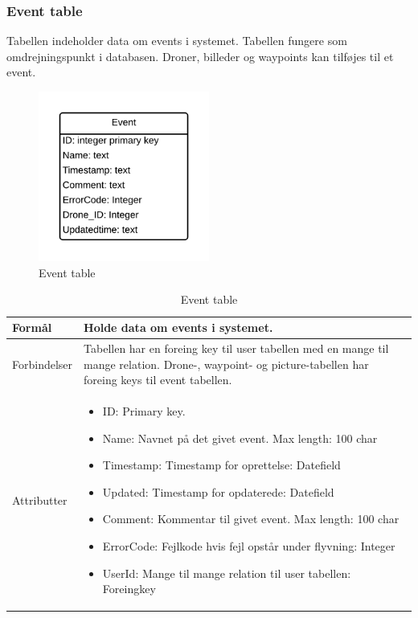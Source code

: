 \subsubsection*{Event table}
Tabellen indeholder data om events i systemet. Tabellen fungere som omdrejningspunkt i databasen. Droner, billeder og waypoints kan tilføjes til et event.
\vspace{-5pt}
\begin{figure}[H]
	\centering
	\includegraphics[width=0.5\textwidth]{Billeder/database/EventTable.png}
	\vspace{-5pt}
	\caption{Event table}
	\label{fig:event_table}
\end{figure}

\begin{table}[H]
\begin{tabular}{| p{3cm}| p{11.5cm}|}
\hline

Formål	 							& Holde data om events i systemet.\\\hline
Forbindelser						& Tabellen har en foreing key til user tabellen med en mange til mange relation. Drone-, waypoint- og picture-tabellen har foreing keys til event tabellen.\\\hline
Attributter						& \begin{itemize}
												\item ID: Primary key.
												\item Name: Navnet på det givet event. Max length: 100 char
												\item Timestamp: Timestamp for oprettelse: Datefield
												\item Updated: Timestamp for opdaterede: Datefield
												\item Comment: Kommentar til givet event. Max length: 100 char
												\item ErrorCode: Fejlkode hvis fejl opstår under flyvning: Integer
												\item UserId: Mange til mange relation til user tabellen: Foreingkey
											\end{itemize} \\\hline 
\end{tabular}
\caption{Event table}
\label{tab:event_table}
\end{table}